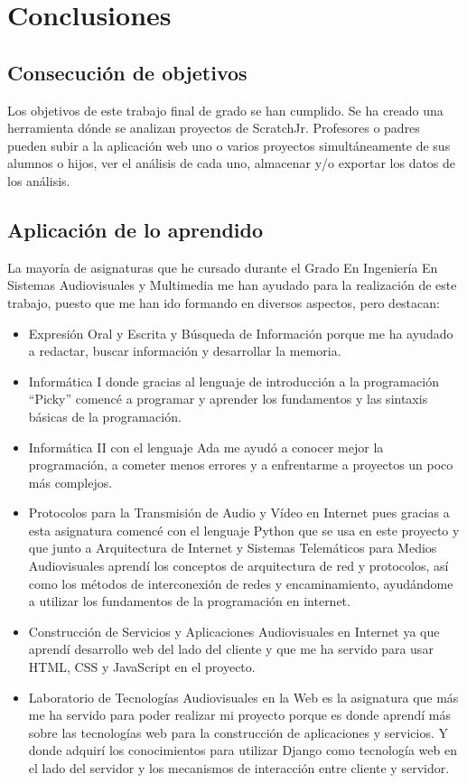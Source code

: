 \documentclass[a4paper, 12pt]{book}
\begin{document}
\cleardoublepage
\chapter{Conclusiones}
\label{chap:conclusiones}


\section{Consecución de objetivos}
\label{sec:consecucion-objetivos}

Los objetivos de este trabajo final de grado se han cumplido. 
Se ha creado una herramienta dónde se analizan proyectos de ScratchJr. 
Profesores o padres pueden subir a la aplicación web uno o varios proyectos simultáneamente de sus alumnos o hijos, ver el análisis de cada uno, almacenar y/o exportar los datos de los análisis.

\section{Aplicación de lo aprendido}
\label{sec:aplicacion_aprendido}

La mayoría de asignaturas que he cursado durante el Grado En Ingeniería En Sistemas Audiovisuales y Multimedia me han ayudado para la realización de este trabajo, puesto que me han ido formando en diversos aspectos, pero destacan:

\begin{itemize}
    \item Expresión Oral y Escrita y Búsqueda de Información porque me ha ayudado a redactar, buscar información y desarrollar la memoria.
    \item Informática I donde gracias al lenguaje de introducción a la programación ``Picky'' comencé a programar y aprender los fundamentos y las sintaxis básicas de la programación. 
    \item Informática II con el lenguaje Ada me ayudó a conocer mejor la programación, a cometer menos errores y a enfrentarme a proyectos un poco más complejos. 
    \item Protocolos para la Transmisión de Audio y Vídeo en Internet pues gracias a esta asignatura comencé con el lenguaje Python que se usa en este proyecto y que junto a Arquitectura de Internet y Sistemas Telemáticos para Medios Audiovisuales aprendí los conceptos de arquitectura de red y protocolos, así como los métodos de interconexión de redes y encaminamiento, ayudándome a utilizar los fundamentos de la programación en internet.
    \item Construcción de Servicios y Aplicaciones Audiovisuales en Internet ya que aprendí desarrollo web del lado del cliente y que me ha servido para usar HTML, CSS y JavaScript en el proyecto.
    \item Laboratorio de Tecnologías Audiovisuales en la Web es la asignatura que más me ha servido para poder realizar mi proyecto porque  es donde aprendí más sobre las tecnologías web para la construcción de aplicaciones y servicios.
    Y donde adquirí los conocimientos para utilizar Django como tecnología web en el lado del servidor y los mecanismos de interacción entre cliente y servidor.
\end{itemize}
\end{document}
